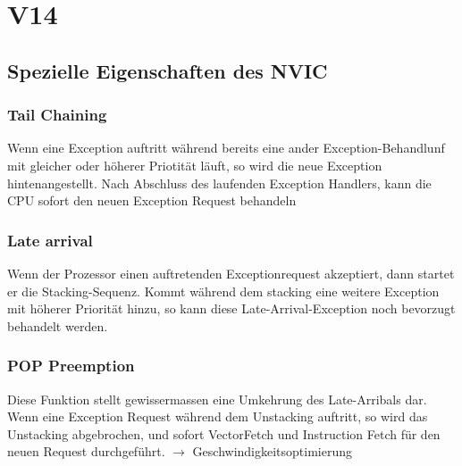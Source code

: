 \section{V14}
\subsection{Spezielle Eigenschaften des NVIC}\label{NVIC}
\subsubsection{Tail Chaining}
Wenn eine Exception auftritt während bereits eine ander Exception-Behandlunf mit gleicher oder höherer Priotität läuft, so wird die neue Exception hintenangestellt. Nach Abschluss des laufenden Exception Handlers, kann die CPU sofort den neuen Exception Request behandeln

\subsubsection{Late arrival}
Wenn der Prozessor einen auftretenden Exceptionrequest akzeptiert, dann startet er die Stacking-Sequenz. Kommt während dem stacking eine weitere Exception mit höherer Priorität hinzu, so kann diese Late-Arrival-Exception noch bevorzugt behandelt werden.

\subsubsection{POP Preemption}
Diese Funktion stellt gewissermassen eine Umkehrung des Late-Arribals dar. Wenn eine Exception Request während dem Unstacking auftritt, so wird das Unstacking abgebrochen, und sofort VectorFetch und Instruction Fetch für den neuen Request durchgeführt. $\rightarrow$ Geschwindigkeitsoptimierung\\

